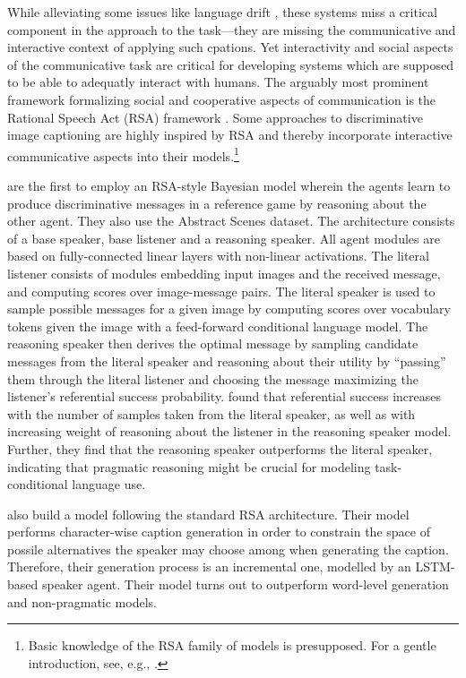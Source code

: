 While alleviating some issues like language drift , these systems miss a critical component in the approach to the task---they are missing the communicative and interactive context of applying such cpations. Yet interactivity and social aspects of the communicative task are critical for developing systems which are supposed to be able to adequatly interact with humans. The arguably most prominent framework formalizing social and cooperative aspects of communication is the Rational Speech Act (RSA) framework \parencite{goodman2016pragmatic}. Some approaches to discriminative image captioning are highly inspired by RSA and thereby incorporate interactive communicative aspects into their models.\footnote{Basic knowledge of the RSA family of models is presupposed. For a gentle introduction, see, e.g., \cite{problang}.} 

\cite{andreas2016reasoning} are the first to employ an RSA-style Bayesian model wherein the agents learn to produce discriminative messages in a reference game by reasoning about the other agent. They also use the Abstract Scenes dataset. The architecture consists of a base speaker, base listener and a reasoning speaker. All agent modules are based on fully-connected linear layers with non-linear activations. The literal listener consists of modules embedding input images and the received message, and computing scores over image-message pairs. The literal speaker is used to sample possible messages for a given image by computing scores over vocabulary tokens given the image with a feed-forward conditional language model. The reasoning speaker then derives the optimal message by sampling candidate messages from the literal speaker and reasoning about their utility by ``passing'' them through the literal listener and choosing the message maximizing the listener's referential success probability. 
\cite{andreas2016reasoning} found that referential success increases with the number of samples taken from the literal speaker, as well as with increasing weight of reasoning about the listener in the reasoning speaker model. Further, they find that the reasoning speaker outperforms the literal speaker, indicating that pragmatic reasoning might be crucial for modeling task-conditional language use. 

\cite{cohn2018pragmatically} also build a model following the standard RSA architecture. Their model performs character-wise caption generation in order to constrain the space of possile alternatives the speaker may choose among when generating the caption. Therefore, their generation process is an incremental one, modelled by an LSTM-based speaker agent. Their model  turns out to outperform word-level generation and non-pragmatic models. 


